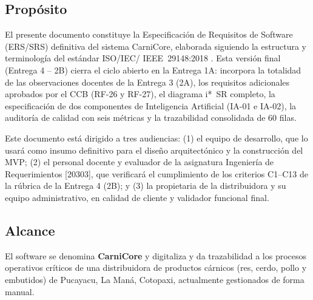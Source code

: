 \documentclass[11pt,a4paper]{article}
\begin{document}
\subsection{Propósito}

El presente documento constituye la Especificación de Requisitos de Software (ERS/SRS) definitiva del sistema CarniCore, elaborada siguiendo la estructura y terminología del estándar ISO/IEC/ IEEE~29148:2018 \cite{iso29148}. Esta versión final (Entrega 4 -- 2B) cierra el ciclo abierto en la Entrega 1A: incorpora la totalidad de las observaciones docentes de la Entrega 3 (2A), los requisitos adicionales aprobados por el CCB (RF-26 y RF-27), el diagrama i*~SR completo, la especificación de dos componentes de Inteligencia Artificial (IA-01 e IA-02), la auditoría de calidad con seis métricas y la trazabilidad consolidada de 60 filas.

Este documento está dirigido a tres audiencias: (1) el equipo de desarrollo, que lo usará como insumo definitivo para el diseño arquitectónico y la construcción del MVP; (2) el personal docente y evaluador de la asignatura Ingeniería de Requerimientos [20303], que verificará el cumplimiento de los criterios C1--C13 de la rúbrica de la Entrega 4 (2B); y (3) la propietaria de la distribuidora y su equipo administrativo, en calidad de cliente y validador funcional final.

\subsection{Alcance}

El software se denomina \textbf{CarniCore} y digitaliza y da trazabilidad a los procesos operativos críticos de una distribuidora de productos cárnicos (res, cerdo, pollo y embutidos) de Pucayacu, La Maná, Cotopaxi, actualmente gestionados de forma manual.
\end{document}
